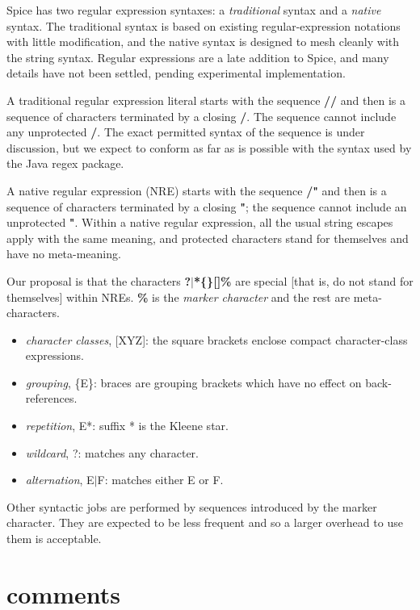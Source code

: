 \documentclass{report}
\begin{document}
Spice has two regular expression syntaxes: a {\em traditional} syntax and a
{\em native} syntax. The traditional syntax is based on existing
regular-expression notations with little modification, and the native
syntax is designed to mesh cleanly with the string syntax. Regular expressions
are a late addition to Spice, and many details have not been settled, pending
experimental implementation.

A traditional regular expression literal starts with the sequence {\bf //} and
then is a sequence of characters terminated by a closing {\bf /}. The sequence
cannot include any unprotected {\bf /}. The exact permitted syntax of the sequence
is under discussion, but we expect to conform as far as is possible with the
syntax used by the Java regex package.

A native regular expression (NRE) starts with the sequence {\bf /"} and then is a
sequence of characters terminated by a closing {\bf "}; the sequence cannot
include an unprotected {\bf "}. Within a native regular expression, all the usual
string escapes apply with the same meaning, and protected characters stand for
themselves and have no meta-meaning.

Our proposal is that the characters {\bf ?$\mid$*\{\}{[}{]}\%} are special {[}that is, do not
stand for themselves{]} within NREs. {\bf \%} is the {\em marker character} and the rest
are meta-characters.

\begin{itemize}\item {\em character classes}, {[}XYZ{]}: the square brackets enclose compact
character-class expressions.

\item {\em grouping}, \{E\}: braces are grouping brackets which have no effect on
back-references.

\item {\em repetition}, E*: suffix * is the Kleene star.

\item {\em wildcard}, ?: matches any character.

\item {\em alternation}, E$\mid$F: matches either E or F.

\end{itemize}Other syntactic jobs are performed by sequences introduced by the marker
character. They are expected to be less frequent and so a larger overhead
to use them is acceptable.\section{comments}
\end{document}
